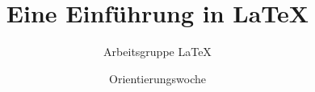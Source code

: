 

\usepackage[ngerman]{babel}
\usepackage[utf8]{inputenc}
\usepackage[T1]{fontenc}
\usepackage{csquotes}

\usepackage{tikz}
\usetikzlibrary{shapes,snakes,arrows}
\usetikzlibrary{positioning}
\usetikzlibrary{arrows}
\usetikzlibrary{calc,fadings,decorations.pathreplacing}

\usepackage[european]{circuitikz}

\usepackage{pgfplots}
\pgfplotsset{compat=1.11}
\graphicspath{{./images/}}

\usepackage[scaled=.90]{helvet}
\renewcommand\ttdefault{txtt}

\subject{\LaTeX}

\title{Eine Einführung in \LaTeX{}}
\author[Arbeitsgruppe \LaTeX]{Arbeitsgruppe \LaTeX}
\date{Orientierungswoche \the\year{}}

\usepackage{color}
\usepackage{ textcomp }
\usepackage{mathtools}





